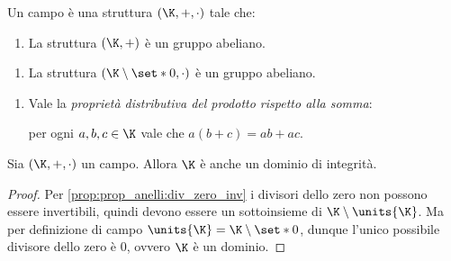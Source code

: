 \begin{remark}
    Un campo è una struttura $(\K, +, \cdot)$ tale che: 
    \begin{enumerate}[label={(S)}]
        \item La struttura $(\K, +)$ è un gruppo abeliano.
    \end{enumerate}
    \begin{enumerate}[label={(P)}]
        \item La struttura $(\K\setminus \set*{0}, \cdot)$ è un gruppo abeliano.
    \end{enumerate}
    \begin{enumerate}[label=(D)]
        \item \label{def:campo:distr} Vale la \emph{proprietà distributiva del prodotto rispetto alla somma}:
         
        per ogni $a, b, c \in \K$ vale che $a(b + c) = ab + ac$.
    \end{enumerate}
\end{remark}

\begin{proposition}
     Sia $(\K, +, \cdot)$ un campo. Allora $\K$ è anche un dominio di integrità.
\end{proposition}
\begin{proof}
    Per \ref{prop:prop_anelli:div_zero_inv} i divisori dello zero non possono essere invertibili, quindi devono essere un sottoinsieme di $\K \setminus \units{\K}$. Ma per definizione di campo $\units{\K} = \K \setminus \set*{0}$, dunque l'unico possibile divisore dello zero è $0$, ovvero $\K$ è un dominio.
\end{proof}

